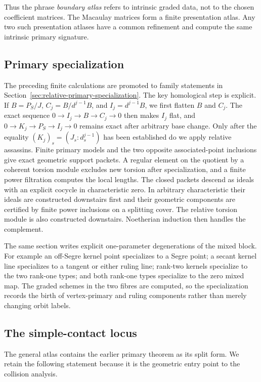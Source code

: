 Thus the phrase \emph{boundary atlas} refers to intrinsic graded
data, not to the chosen coefficient matrices.  The Macaulay matrices
form a finite presentation atlas.  Any two such presentation atlases
have a common refinement and compute the same intrinsic primary
signature.


\subsection{Primary specialization}

The preceding finite calculations are promoted to family statements
in Section~\ref{sec:relative-primary-specialization}.  The key
homological step is explicit.  If \(B=P_S/J\),
\(C_j=B/d^{j-1}B\), and \(I_j=d^{j-1}B\), we first flatten
\(B\) and \(C_j\).  The exact sequence
\(0\to I_j\to B\to C_j\to0\) then makes \(I_j\) flat, and
\(0\to K_j\to P_S\to I_j\to0\) remains exact after arbitrary
base change.  Only after the equality
\((K_j)_s=(J_s:d_s^{j-1})\) has been established do we apply
relative assassins.  Finite primary models and the two opposite associated-point inclusions
give exact geometric support packets.  A regular element on the quotient
by a coherent torsion module excludes new torsion after specialization,
and a finite power filtration computes the local lengths.  The
closed packets descend as ideals with an explicit cocycle in
characteristic zero.  In arbitrary characteristic their ideals are
constructed downstairs first and their geometric components are
certified by finite power inclusions on a splitting cover.  The
relative torsion module is also constructed downstairs.  Noetherian
induction then handles the complement.

The same section writes explicit one-parameter degenerations of the
mixed block.  For example an off-Segre kernel point specializes to a
Segre point; a secant kernel line specializes to a tangent or either
ruling line; rank-two kernels specialize to the two rank-one types;
and both rank-one types specialize to the zero mixed map.  The
graded schemes in the two fibres are computed, so the specialization
records the birth of vertex-primary and ruling components rather than
merely changing orbit labels.


\subsection{The simple-contact locus}

The general atlas contains the earlier primary theorem as its split
form.  We retain the following statement because it is the geometric
entry point to the collision analysis.

